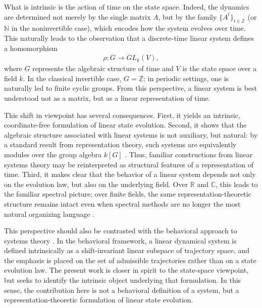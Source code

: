 \documentclass[letterpaper, 9pt, conference]{ieeeconf}
\begin{document}
What is intrinsic is the action of time on the state space. Indeed, the dynamics
are determined not merely by the single matrix $A$, but by the family
$\{A^t\}_{t \in \mathbb{Z}}$ (or $\mathbb{N}$ in the noninvertible case), which
encodes how the system evolves over time. This naturally leads to the observation
that a discrete-time linear system defines a homomorphism
\begin{eqnarray}
\rho : G \to GL_k(V),
\end{eqnarray}
where $G$ represents the algebraic structure of time and $V$ is the state space
over a field $k$. In the classical invertible case, $G = \mathbb{Z}$; in periodic
settings, one is naturally led to finite cyclic groups. From this perspective, a
linear system is best understood not as a matrix, but as a linear representation
of time.

This shift in viewpoint has several consequences. First, it yields an intrinsic,
coordinate-free formulation of linear state evolution. Second, it shows that the
algebraic structure associated with linear systems is not auxiliary, but natural:
by a standard result from representation theory, such systems are equivalently
modules over the group algebra $k[G]$
\cite{serre_linear_representation_book,dummit_foote,lang_algebra_book}. Thus,
familiar constructions from linear systems theory may be reinterpreted as
structural features of a representation of time. Third, it makes clear that the
behavior of a linear system depends not only on the evolution law, but also on
the underlying field. Over $\mathbb{R}$ and $\mathbb{C}$, this leads to the
familiar spectral picture; over finite fields, the same representation-theoretic
structure remains intact even when spectral methods are no longer the most natural
organizing language \cite{lidl_niederreiter_finite_fields}.

This perspective should also be contrasted with the behavioral approach to
systems theory \cite{willems_behavioral_1986,polderman_willems,willems_polderman_book,oberst_multidimensional}. In the behavioral framework, a linear dynamical system is defined intrinsically as a shift-invariant linear subspace of trajectory space, and the emphasis is placed on the set of admissible trajectories rather than on a state evolution law. The present work is closer in spirit to the state-space viewpoint, but seeks to identify the intrinsic object underlying that formulation. In this sense, the contribution here is not a behavioral definition of a system, but a representation-theoretic formulation of linear state evolution.
\end{document}
